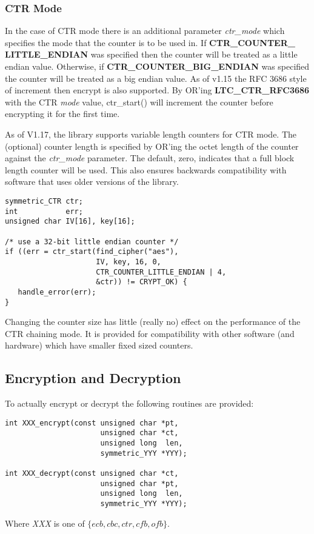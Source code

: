 \documentclass[synpaper]{book}
\begin{document}
\subsubsection{CTR Mode}
In the case of CTR mode there is an additional parameter \textit{ctr\_mode} which specifies the mode that the counter is to be used in.
If \textbf{CTR\_COUNTER\_ LITTLE\_ENDIAN} was specified then the counter will be treated as a little endian value.  Otherwise, if
\textbf{CTR\_COUNTER\_BIG\_ENDIAN} was specified the counter will be treated as a big endian value.  As of v1.15 the RFC 3686 style of
increment then encrypt is also supported.  By OR'ing \textbf{LTC\_CTR\_RFC3686} with the CTR \textit{mode} value, ctr\_start() will increment
the counter before encrypting it for the first time.

As of V1.17, the library supports variable length counters for CTR mode.  The (optional) counter length is specified by OR'ing the octet
length of the counter against the \textit{ctr\_mode} parameter.  The default, zero, indicates that a full block length counter will be used.  This also
ensures backwards compatibility with software that uses older versions of the library.

\begin{small}
\begin{verbatim}
symmetric_CTR ctr;
int           err;
unsigned char IV[16], key[16];

/* use a 32-bit little endian counter */
if ((err = ctr_start(find_cipher("aes"),
                     IV, key, 16, 0,
                     CTR_COUNTER_LITTLE_ENDIAN | 4,
                     &ctr)) != CRYPT_OK) {
   handle_error(err);
}
\end{verbatim}
\end{small}

Changing the counter size has little (really no) effect on the performance of the CTR chaining mode.  It is provided for compatibility
with other software (and hardware) which have smaller fixed sized counters.

\subsection{Encryption and Decryption}
To actually encrypt or decrypt the following routines are provided:
   
     
\begin{verbatim}
int XXX_encrypt(const unsigned char *pt,
                      unsigned char *ct,
                      unsigned long  len,
                      symmetric_YYY *YYY);

int XXX_decrypt(const unsigned char *ct,
                      unsigned char *pt,
                      unsigned long  len,
                      symmetric_YYY *YYY);
\end{verbatim}
Where \textit{XXX} is one of $\lbrace ecb, cbc, ctr, cfb, ofb \rbrace$.
\end{document}
